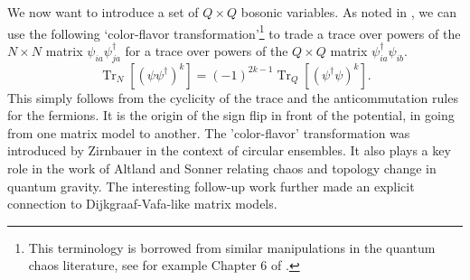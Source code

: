 \documentclass[english]{article}
\DeclareMathOperator{\Tr}{Tr}
\begin{document}
We now want to introduce a set of $Q\times Q$ bosonic variables. As noted in \cite{goel2021string}, we can use the following `color-flavor transformation'\footnote{This terminology is borrowed from similar manipulations in the quantum chaos literature, see for example Chapter 6 of \cite{quantumChaos}.} to trade a trace over powers of the $N\times N$ matrix $\psi_{ia}\psi^{\dagger}_{ja}$ for a trace over powers of the $Q \times Q$ matrix $\psi^{\dagger}_{ia}\psi_{ib}$. 
\begin{equation} \label{eq:colorflavor}
     \Tr_{N} \left[ (\psi\psi^{\dagger})^{k} \right] = (-1)^{2k-1} \Tr_{Q} \left[ (\psi^{\dagger}\psi)^k \right].
\end{equation}
This simply follows from the cyclicity of the trace and the anticommutation rules for the fermions. It is the origin of the sign flip in front of the potential, in going from one matrix model to another. The 'color-flavor' transformation was introduced by Zirnbauer \cite{Zirnbauer1996} in the context of circular ensembles. It also plays a key role in the work of Altland and Sonner \cite{AltlandSonner2020} relating chaos and topology change in quantum gravity. The interesting follow-up work \cite{Altland2022} further made an explicit connection to Dijkgraaf-Vafa-like matrix models.   
\end{document}
